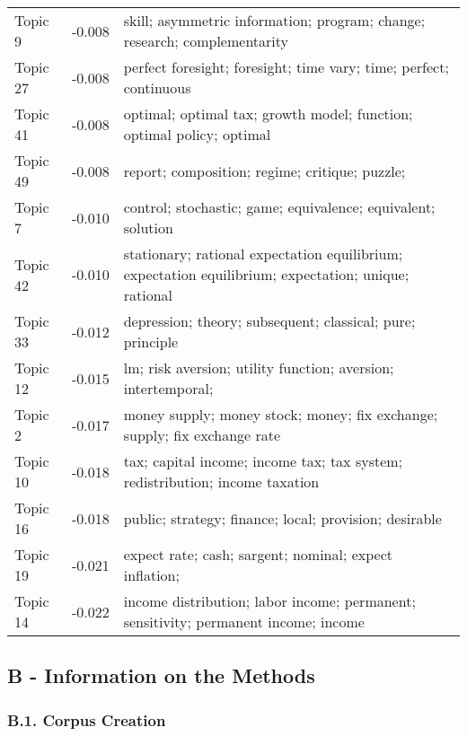 \documentclass[]{elsarticle} %
\begin{document}
\begin{ThreePartTable}
\begin{longtable}[t]{>{}l>{}r>{\raggedright\arraybackslash}m{25em}}
Topic 9 & -0.008 & skill;
asymmetric
information;
program;
change;
research;
complementarity\\
Topic 27 & -0.008 & perfect
foresight;
foresight;
time
vary;
time;
perfect;
continuous
\cellcolor{gray!6}{time}\\
Topic 41 & -0.008 & optimal;
optimal
tax;
growth
model;
function;
optimal
policy;
optimal
\cellcolor{gray!6}{taxation}\\
\addlinespace
Topic 49 & -0.008 & report;
composition;
regime;
critique;
puzzle;
\cellcolor{gray!6}{profit}\\
Topic 7 & -0.010 & control;
stochastic;
game;
equivalence;
equivalent;
solution\\
Topic 42 & -0.010 & stationary;
rational
expectation
equilibrium;
expectation
equilibrium;
expectation;
unique;
rational
\cellcolor{gray!6}{expectation}\\
Topic 33 & -0.012 & depression;
theory;
subsequent;
classical;
pure;
principle\\
Topic 12 & -0.015 & lm;
risk
aversion;
utility
function;
aversion;
intertemporal;
\cellcolor{gray!6}{risk}\\
\addlinespace
Topic 2 & -0.017 & money
supply;
money
stock;
money;
fix
exchange;
supply;
fix
exchange
rate\\
Topic 10 & -0.018 & tax;
capital
income;
income
tax;
tax
system;
redistribution;
income
taxation\\
Topic 16 & -0.018 & public;
strategy;
finance;
local;
provision;
desirable\\
Topic 19 & -0.021 & expect
rate;
cash;
sargent;
nominal;
expect
inflation;
\cellcolor{gray!6}{expect}\\
Topic 14 & -0.022 & income
distribution;
labor
income;
permanent;
sensitivity;
permanent
income;
income\\*
\end{longtable}
\end{ThreePartTable}
\endgroup{}

\newpage

\hypertarget{appendix}{%
\subsection*{B - Information on the Methods}\label{appendix}}

\hypertarget{corpus}{%
\subsubsection*{B.1. Corpus Creation}\label{corpus}}
\end{document}
